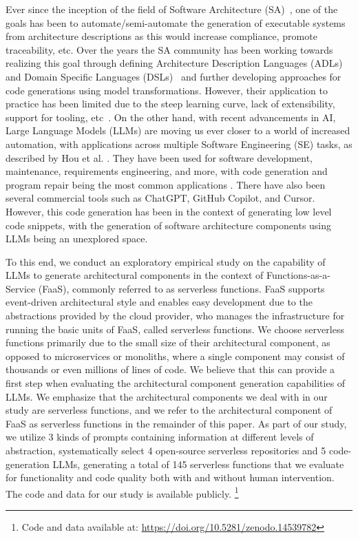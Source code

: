 Ever since the inception of the field of Software Architecture (SA)~\cite{garlan1993_component_connector}, one of the goals has been to automate/semi-automate the generation of executable systems from architecture descriptions as this would increase compliance, promote traceability, etc. Over the years the SA community has been working towards realizing this goal through defining Architecture Description Languages (ADLs) and Domain Specific Languages (DSLs)~\cite{mehmood2013aspect,malavolta2012industry,aadl-robotics} and further developing approaches for code generations using model transformations. However, their application to practice has been limited due to the steep learning curve, lack of extensibility, support for tooling, etc~\cite{malavolta2012industry}.  On the other hand, with recent advancements in AI, Large Language Models (LLMs) are moving us ever closer to a world of increased automation, with applications across multiple Software Engineering (SE) tasks, as described by Hou et al. \cite{davidlo_llm_slr}. They have been used for software development, maintenance, requirements engineering, and more, with code generation and program repair being the most common applications \cite{davidlo_llm_slr}. There have also been several commercial tools such as ChatGPT, GitHub Copilot, and Cursor. However, this code generation has been in the context of generating low level code snippets, with the generation of software architecture components using LLMs being an unexplored space. 

To this end, we conduct an exploratory empirical study on the capability of LLMs to generate architectural components in the context of Functions-as-a-Service (FaaS), commonly referred to as serverless functions. FaaS supports event-driven architectural style and enables easy development due to the abstractions provided by the cloud provider, who manages the infrastructure for running the basic units of FaaS, called serverless functions. We choose serverless functions primarily due to the small size of their architectural component, as opposed to microservices or monoliths, where a single component may consist of thousands or even millions of lines of code. We believe that this can provide a first step when evaluating the architectural component generation capabilities of LLMs. We emphasize that the architectural components we deal with in our study are serverless functions, and we refer to the architectural component of FaaS as serverless functions in the remainder of this paper. As part of our study, we utilize 3 kinds of prompts containing information at different levels of abstraction, systematically select 4 open-source serverless repositories and 5 code-generation LLMs, generating a total of 145 serverless functions that we evaluate for functionality and code quality both with and without human intervention. 
The code and data for our study is available publicly. \footnote{Code and data available at: \url{https://doi.org/10.5281/zenodo.14539782}}

